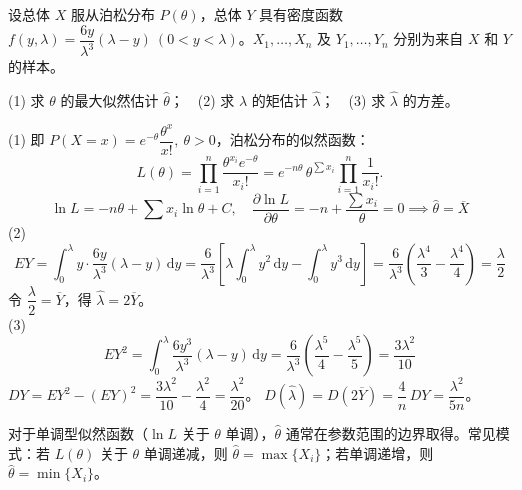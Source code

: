 ﻿\documentclass[lang=cn,11pt]{elegantbook}
\begin{document}
\begin{exercise}\label{exer:7-poisson-tri}
设总体 \(X\) 服从泊松分布 \(P(\theta)\)，总体 \(Y\) 具有密度函数 \(f(y,\lambda) = \dfrac{6y}{\lambda^3}(\lambda-y)\ (0 < y < \lambda)\)。\(X_1, \dots, X_n\) 及 \(Y_1, \dots, Y_n\) 分别为来自 \(X\) 和 \(Y\) 的样本。\par
(1) 求 \(\theta\) 的最大似然估计 \(\hat{\theta}\)；~~(2) 求 \(\lambda\) 的矩估计 \(\hat{\lambda}\)；~~(3) 求 \(\hat{\lambda}\) 的方差。
\end{exercise}
\begin{solution}
(1) 即 \(P(X=x) = e^{-\theta}\dfrac{\theta^x }{x!},\ \theta > 0\)，泊松分布的似然函数：
\[
L(\theta) = \prod_{i=1}^{n}\frac{\theta^{x_i}e^{-\theta}}{x_i!} = e^{-n\theta}\,\theta^{\sum x_i}\prod_{i=1}^{n}\frac{1}{x_i!}.
\]
\[
\ln L = -n\theta + \sum x_i\ln\theta + C,\quad \frac{\partial\ln L}{\partial\theta} = -n + \frac{\sum x_i}{\theta} = 0\implies \hat{\theta} = \overline{X}
\]
(2) \[EY = \displaystyle\int_0^\lambda y\cdot\frac{6y}{\lambda^3}(\lambda-y)\,\mathrm{d}y = \frac{6}{\lambda^3}\!\left[\lambda\int_0^\lambda y^2\,\mathrm{d}y - \int_0^\lambda y^3\,\mathrm{d}y\right] = \frac{6}{\lambda^3}\!\left(\frac{\lambda^4}{3}-\frac{\lambda^4}{4}\right) = \frac{\lambda}{2}\]
令 \(\dfrac{\lambda}{2} = \overline{Y}\)，得 \(\hat{\lambda} = 2\overline{Y}\)。\\
(3) \[EY^2 = \displaystyle\int_0^\lambda \frac{6y^3}{\lambda^3}(\lambda-y)\,\mathrm{d}y = \frac{6}{\lambda^3}\!\left(\frac{\lambda^5}{4}-\frac{\lambda^5}{5}\right) = \frac{3\lambda^2}{10}\]
\(DY = EY^2 - (EY)^2 = \dfrac{3\lambda^2}{10} - \dfrac{\lambda^2}{4} = \dfrac{\lambda^2}{20}\)。
\(D(\hat{\lambda}) = D(2\overline{Y}) = \dfrac{4}{n}\,DY = \dfrac{\lambda^2}{5n}\)。
\end{solution}

\begin{note}
对于单调型似然函数（\(\ln L\) 关于 \(\theta\) 单调），\(\hat{\theta}\) 通常在参数范围的边界取得。常见模式：若 \(L(\theta)\) 关于 \(\theta\) 单调递减，则 \(\hat{\theta} = \max\{X_i\}\)；若单调递增，则 \(\hat{\theta} = \min\{X_i\}\)。
\end{note}
\end{document}
